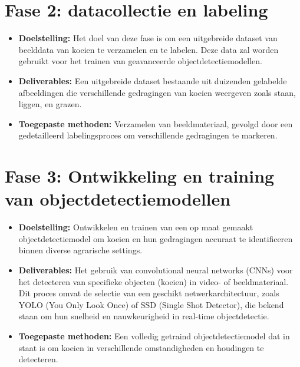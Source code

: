 \section{Fase 2: datacollectie en labeling}
\begin{itemize}
    \item \textbf{Doelstelling:} Het doel van deze fase is om een uitgebreide dataset van beelddata van koeien te verzamelen en te labelen. Deze data zal worden gebruikt voor het trainen van geavanceerde objectdetectiemodellen.
    \item \textbf{Deliverables:} Een uitgebreide dataset bestaande uit duizenden gelabelde afbeeldingen die verschillende gedragingen van koeien weergeven zoals staan, liggen, en grazen.
    \item \textbf{Toegepaste methoden:} Verzamelen van beeldmateriaal, gevolgd door een gedetailleerd labelingsproces om verschillende gedragingen te markeren.
\end{itemize}
\section{Fase 3: Ontwikkeling en training van objectdetectiemodellen}
\begin{itemize}
    \item \textbf{Doelstelling:} Ontwikkelen en trainen van een op maat gemaakt objectdetectiemodel om koeien en hun gedragingen accuraat te identificeren binnen diverse agrarische settings.
    \item \textbf{Deliverables:} Het gebruik van convolutional neural networks (CNNs) voor het detecteren van specifieke objecten (koeien) in video- of beeldmateriaal. Dit proces omvat de selectie van een geschikt netwerkarchitectuur, zoals YOLO (You Only Look Once) of SSD (Single Shot Detector), die bekend staan om hun snelheid en nauwkeurigheid in real-time objectdetectie.
    \item \textbf{Toegepaste methoden:} Een volledig getraind objectdetectiemodel dat in staat is om koeien in verschillende omstandigheden en houdingen te detecteren.
\end{itemize}
